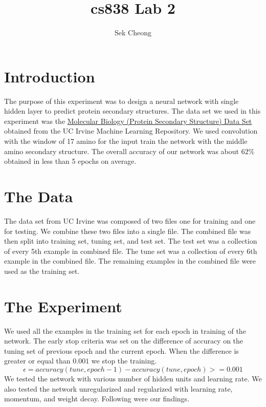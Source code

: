 \documentclass{article}
\begin{document}
\title{cs838 Lab 2}
\author{Sek Cheong}

\maketitle


\section{Introduction}
The purpose of this experiment was to design a neural network with single hidden layer to predict protein secondary structures. The data set we used in this experiment was the \href{https://archive.ics.uci.edu/ml/datasets/Molecular+Biology+(Protein+Secondary+Structure)}{Molecular Biology (Protein Secondary Structure) Data Set} obtained from the UC Irvine Machine Learning Repository. We used convolution with the window of 17 amino for the input train the network with the middle amino secondary structure. The overall accuracy of our network was about $62\%$ obtained in less than 5 epochs on average.

\section{The Data}
The data set from UC Irvine was composed of two files one for training and one for testing. We combine these two files into a single file. The combined file was then split into training set, tuning set, and test set.  The test set was a collection of every 5th example in combined file. The tune set was a collection of every 6th example in the combined file. The remaining examples in the combined file were used as the training set. 

\section{The Experiment}
We used all the examples in the training set for each epoch in training of the network. The early stop criteria was set on the difference of accuracy on the tuning set of previous epoch and the current epoch. When the difference is greater or equal than $0.001$ we stop the training. 
\begin{equation}
\epsilon = accuracy(tune,epoch-1) - accuracy(tune, epoch) >= 0.001
\end{equation}
We tested the network with various number of hidden units and learning rate. We also tested the network unregularized and regularized with learning rate, momentum, and weight decay. Following were our findings. 
\end{document}

